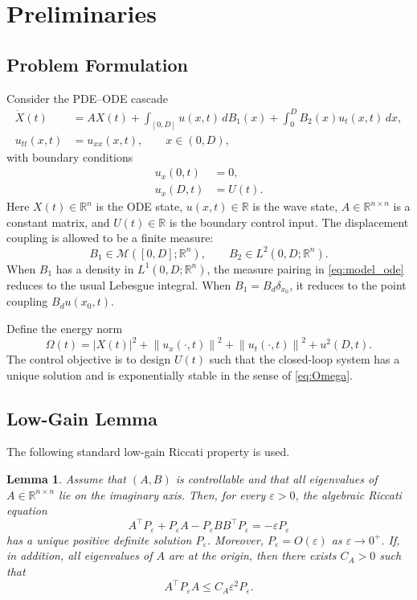 \documentclass[journal]{IEEEtran}
\newtheorem{lemma}{Lemma}
\newcommand{\R}{\mathbb R}
\newcommand{\eps}{\varepsilon}
\newcommand{\Mcal}{\mathcal M}
\newcommand{\norm}[1]{\left\|#1\right\|}
\newcommand{\abs}[1]{\left|#1\right|}
\begin{document}
\section{Preliminaries}

\subsection{Problem Formulation}

Consider the PDE--ODE cascade
\begin{align}
 \dot X(t)&=AX(t)+\int_{[0,D]} u(x,t)\,dB_1(x)
 +\int_0^D B_2(x)u_t(x,t)\,dx,\label{eq:model_ode}\\
 u_{tt}(x,t)&=u_{xx}(x,t),\qquad x\in(0,D),\label{eq:model_wave}
\end{align}
with boundary conditions
\begin{align}
 u_x(0,t)&=0,\label{eq:left_neumann}\\
 u_x(D,t)&=U(t).\label{eq:right_control}
\end{align}
Here $X(t)\in\R^n$ is the ODE state, $u(x,t)\in\R$ is the wave state, $A\in\R^{n\times n}$ is a constant matrix, and $U(t)\in\R$ is the boundary control input. The displacement coupling is allowed to be a finite measure:
\begin{equation}
 B_1\in \Mcal([0,D];\R^n),\qquad B_2\in L^2(0,D;\R^n).\label{eq:B_regular_measure}
\end{equation}
When $B_1$ has a density in $L^1(0,D;\R^n)$, the measure pairing in \eqref{eq:model_ode} reduces to the usual Lebesgue integral. When $B_1=B_d\delta_{x_0}$, it reduces to the point coupling $B_du(x_0,t)$.

Define the energy norm
\begin{equation}
 \Omega(t)=\abs{X(t)}^2+\norm{u_x(\cdot,t)}^2+\norm{u_t(\cdot,t)}^2+u^2(D,t).\label{eq:Omega}
\end{equation}
The control objective is to design $U(t)$ such that the closed-loop system has a unique solution and is exponentially stable in the sense of \eqref{eq:Omega}.

\subsection{Low-Gain Lemma}

The following standard low-gain Riccati property is used.

\begin{lemma}\label{lem:riccati}
Assume that $(A,B)$ is controllable and that all eigenvalues of $A\in\R^{n\times n}$ lie on the imaginary axis. Then, for every $\eps>0$, the algebraic Riccati equation
\begin{equation}
 A^\top P_\eps+P_\eps A-P_\eps BB^\top P_\eps=-\eps P_\eps\label{eq:ARE_basic}
\end{equation}
has a unique positive definite solution $P_\eps$. Moreover, $P_\eps=O(\eps)$ as $\eps\to0^+$. If, in addition, all eigenvalues of $A$ are at the origin, then there exists $C_A>0$ such that
\begin{equation}
 A^\top P_\eps A\le C_A\eps^2P_\eps.\label{eq:nilpotent_riccati_bound}
\end{equation}
\end{lemma}
\end{document}
